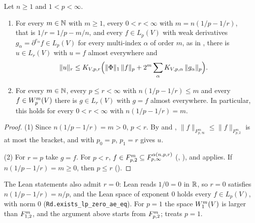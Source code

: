 \begin{theorem}
\label{thm:critical-sobolev-embedding}
\leanok
{}
Let $n \geq 1$ and $1 < p < \infty$.
\begin{enumerate}
  \item For every $m \in \mathbb{N}$ with $m \geq 1$, every $0 < r < \infty$ with $m = n(1/p - 1/r)$,
    that is $1/r = 1/p - m/n$, and every $f \in L_p(V)$ with weak derivatives
    $g_\alpha = \partial^{e_\alpha} f \in L_p(V)$ for every multi-index $\alpha$ of order $m$, as
    in , there is $u \in L_r(V)$ with $u = f$ almost
    everywhere and
    \[
      \|u\|_r \leq K_{V,p,r} \Bigl( \|\Phi\|_1 \, \|f\|_p
        + 2^m \sum_\alpha K_{V,p,\alpha} \, \|g_\alpha\|_p \Bigr) .
    \]
  \item For every $m \in \mathbb{N}$, every $p \leq r < \infty$ with $n(1/p - 1/r) \leq m$ and every
    $f \in W^{m}_{p}(V)$ there is $g \in L_r(V)$ with $g = f$ almost everywhere. In particular,
    this holds for every $0 < r < \infty$ with $n(1/p - 1/r) = m$.
\end{enumerate}
\end{theorem}

\begin{proof}
\leanok
(1) Since $n(1/p - 1/r) = m > 0$, $p < r$. By  and
, $\|f\|_{F^m_{p,\infty}} \leq \|f\|_{F^m_{p,2}}$ is at
most the bracket, and  with $p_0 = p$, $p_1 = r$ gives $u$.

(2) For $r = p$ take $g = f$. For $p < r$,
$f \in F^{m}_{p,2} \subseteq F^{\alpha(n, p, r)}_{p,\infty}$
(, ), and
 applies. If $n(1/p - 1/r) = m \geq 0$, then $p \leq r$
().
\end{proof}

The Lean statements also admit $r = 0$: Lean reads $1/0 = 0$ in $\mathbb{R}$, so $r = 0$ satisfies
$n(1/p - 1/r) = n/p$, and the Lean space of exponent $0$ holds every $f \in L_p(V)$, with norm $0$
(\texttt{Rd.\allowbreak exists\_\allowbreak lp\_\allowbreak zero\_\allowbreak ae\_\allowbreak eq}).
For $p = 1$ the space $W^{m}_{1}(V)$ is larger than $F^{m}_{1,2}$, and the argument above
starts from $F^{m}_{p,2}$;  treats $p = 1$.

